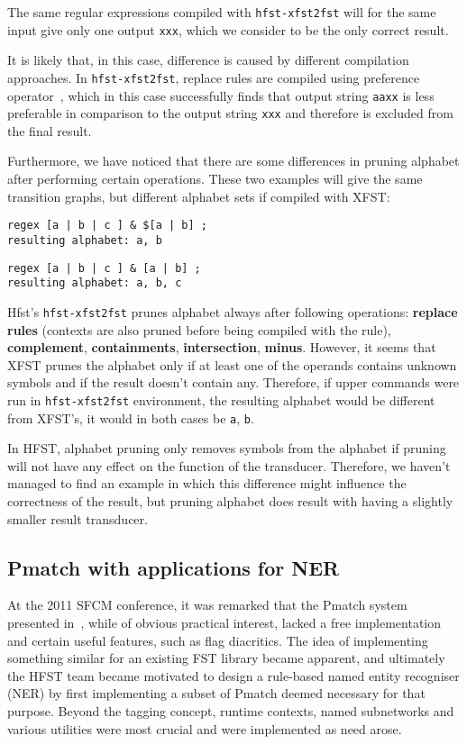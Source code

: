 \documentclass{llncs}
\begin{document}
The same regular expressions compiled with \verb+hfst-xfst2fst+ will for the same
input give only one output \verb+xxx+, which we consider to be the only correct
result.

It is likely that, in this case, difference is caused by different compilation approaches.
In \verb+hfst-xfst2fst+, replace rules are compiled using preference
operator~\cite{drobac/2012}, which in this case successfully finds that output string
\verb+aaxx+ is less preferable in comparison to the output string \verb+xxx+ and therefore is excluded from the final result.



Furthermore, we have noticed that there are some differences in pruning alphabet
after performing certain operations.
These two examples will give the same transition graphs, but different alphabet
sets if compiled with XFST:
\begin{verbatim}
regex [a | b | c ] & $[a | b] ;
resulting alphabet: a, b
\end{verbatim}
\begin{verbatim}
regex [a | b | c ] & [a | b] ;
resulting alphabet: a, b, c
\end{verbatim}



Hfst's \verb+hfst-xfst2fst+ prunes alphabet always after following operations:
\textbf{replace rules} (contexts are also pruned before being compiled with the
rule), \textbf{complement}, \textbf{containments}, \textbf{intersection},
\textbf{minus}. However, it seems that XFST prunes the alphabet only if at
least one of the operands contains unknown symbols and if the result doesn't
contain any. Therefore, if upper commands were run in \verb+hfst-xfst2fst+
environment, the resulting alphabet would be different from XFST's, it
would in both cases be \verb+a+, \verb+b+.

In HFST, alphabet pruning only removes symbols from the alphabet if pruning will not have any effect on the function of the transducer.
Therefore, we haven't managed to find an example in which this difference might influence
the correctness of the result, but pruning alphabet does result with
having a slightly smaller result transducer.


\subsection{Pmatch with applications for NER}

At the 2011 SFCM conference, it was remarked that the Pmatch system presented
in~\cite{karttunen/2011}, while
of obvious practical interest, lacked a free implementation and certain
useful features, such as flag diacritics. The idea of implementing
something similar for an existing FST library became apparent, and
ultimately the HFST team became motivated to design a rule-based named entity
recogniser (NER) by first implementing a subset of Pmatch deemed
necessary for that purpose. Beyond the tagging concept,
runtime contexts, named subnetworks and various utilities were most crucial and
were implemented as need arose.
\end{document}
